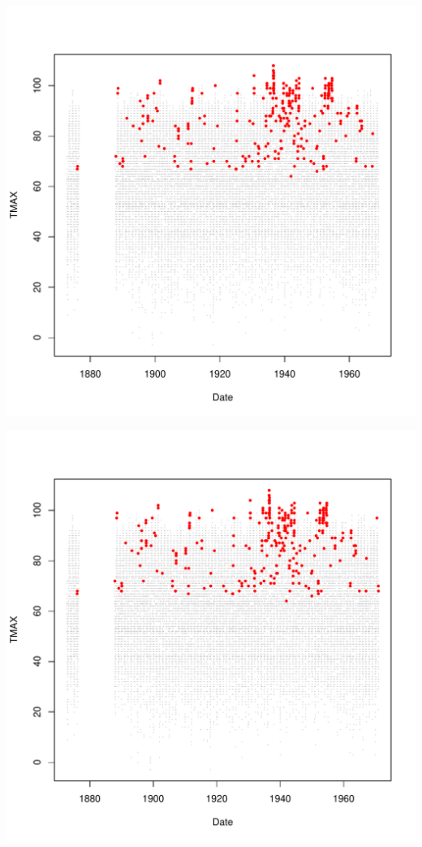 \documentclass{article}\usepackage[]{graphicx}\usepackage[]{color}
\makeatletter
\def\maxwidth{ %
  \ifdim\Gin@nat@width>\linewidth
    \linewidth
  \else
    \Gin@nat@width
  \fi
}
\newenvironment{knitrout}{}{} %
\makeatother
\begin{document}
\begin{knitrout}
\includegraphics[width=\maxwidth]{figure/unnamed-chunk-4-44} 

\includegraphics[width=\maxwidth]{figure/unnamed-chunk-4-45} 


\end{knitrout}
\end{document}
